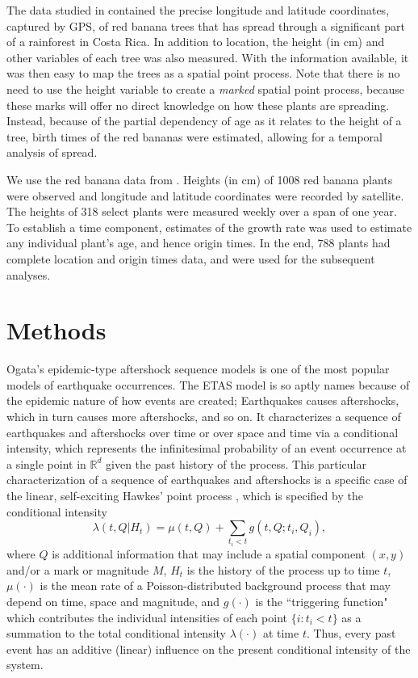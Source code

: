 \documentclass[11pt]{article}\usepackage[]{graphicx}\usepackage[]{color}
\providecommand{\real}[1]{\mathbb{#1}}
\begin{document}
The data studied in \cite{Balderama12} contained the precise longitude and latitude coordinates, captured by GPS, of red banana trees that has spread through a significant part of a rainforest in Costa Rica. In addition to location, the height (in cm) and other variables of each tree was also measured. With the information available, it was then easy to map the trees as a spatial point process. Note that there is no need to use the height variable to create a {\it marked} spatial point process, because these marks will offer no direct knowledge on how these plants are spreading. Instead, because of the partial dependency of age as it relates to the height of a tree, birth times of the red bananas were estimated, allowing for a temporal analysis of spread.


We use the red banana data from \cite{Balderama12}. Heights (in cm) of 1008 red banana plants were observed and longitude and latitude coordinates were recorded by satellite. The heights of 318 select plants were measured weekly over a span of one year. To establish a time component, estimates of the growth rate was used to estimate any individual plant's age, and hence origin times. In the end, 788 plants had complete location and origin times data, and were used for the subsequent analyses.

\section{Methods}

Ogata's epidemic-type aftershock sequence models \citep{Ogata88,Ogata98} is one of the most popular models of earthquake occurrences. The ETAS model is so aptly names because of the epidemic nature of how events are created; Earthquakes causes aftershocks, which in turn causes more aftershocks, and so on. It characterizes a sequence of earthquakes and aftershocks over time or over space and time via a conditional intensity, which represents the infinitesimal probability of an event occurrence at a single point in $\real{R}^d$ given the past history of the process. This particular characterization of a sequence of earthquakes and aftershocks is a specific case of the linear, self-exciting Hawkes' point process \citep{Hawkes71}, which is specified by the conditional intensity
\begin{equation}\label{hawkes}
\lambda(t, Q | H_t) = \mu(t,Q) + \sum_{t_i < t} g(t,Q; t_i, Q_i),
\end{equation}
where $Q$ is additional information that may include a spatial component $(x,y)$ and/or a mark or magnitude $M$, $H_t$ is the history of the process up to time $t$, $\mu(\cdot)$ is the mean rate of a Poisson-distributed background process that may depend on time, space and magnitude, and $g(\cdot)$ is the ``triggering function" which contributes the individual intensities of each point $\{i: t_i < t\}$ as a summation to the total conditional intensity $\lambda(\cdot)$ at time $t$. Thus, every past event has an additive (linear) influence on the present conditional intensity of the system.
\end{document}

